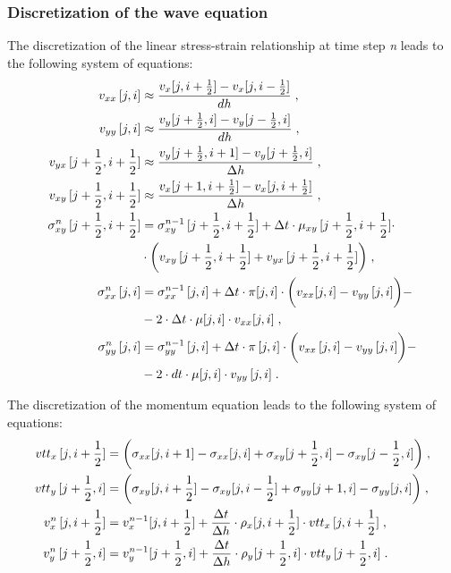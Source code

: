 \subsubsection{Discretization of the wave equation}
\label{discretization}
The discretization of the linear stress-strain relationship at time step \textit{n} leads to the following system of equations:
\begin{equation}
\allowdisplaybreaks
    \begin{split}
        v_{xx}\,[j,i] & \approx \frac{v_x [j,i+\frac{1}{2}]-v_x[j,i-\frac{1}{2}]}{dh}\;,\\
        v_{yy}\,[j,i] & \approx \frac{v_y [j+\frac{1}{2},i]-v_y[j-\frac{1}{2},i]}{dh}\;,\\
        v_{yx}\,[j+\frac{1}{2},i+\frac{1}{2}] & \approx \frac{v_y [j+\frac{1}{2},i+1]-v_y [j+\frac{1}{2},i]}{\Delta h}\;,\\
        v_{xy}\,[j+\frac{1}{2},i+\frac{1}{2}] & \approx \frac{v_x  [j+1,i+\frac{1}{2}]-v_x [j,i+\frac{1}{2}]}{\Delta h}\;,\\
        \sigma_{xy}^{n}\,[j+\frac{1}{2},i+\frac{1}{2}] &= \sigma_{xy}^{n-1}\,[j+\frac{1}{2},i+\frac{1}{2}] + \Delta t \cdot \mu_{xy} \,[j+\frac{1}{2},i+\frac{1}{2}] \cdot\\
        & \cdot \biggl(v_{xy}\,[j+\frac{1}{2},i+\frac{1}{2}] + v_{yx} \,[j+\frac{1}{2},i+\frac{1}{2}]\biggr)\;,\\
        \sigma_{xx}^{n}\,[j,i] &= \sigma_{xx}^{n-1}\,[j,i] + \Delta t \cdot \pi [j,i] \cdot \biggl(v_{xx} [j,i] - v_{yy}\,[j,i] \biggr) - \\
        & -2 \cdot \Delta t \cdot \mu [j,i] \cdot v_{xx} [j,i]\;,\\
        \sigma_{yy}^{n}\,[j,i] &= \sigma_{yy}^{n-1}\,[j,i] + \Delta t \cdot \pi\,[j,i] \cdot \biggl(v_{xx}\,[j,i] - v_{yy}\,[j,i] \biggr) -\\
        & -2 \cdot dt \cdot \mu [j,i] \cdot v_{yy}\,[j,i]\;.
        \label{eq:discr_stress}
    \end{split}
\end{equation}
 
The discretization of the momentum equation leads to the following system of equations:
\begin{equation}
\allowdisplaybreaks
    \begin{split}
        vtt_x\,[j,i+\frac{1}{2}] &= \biggl(\sigma_{xx} [j,i+1] - \sigma_{xx}[j,i] + \sigma_{xy}[j+\frac{1}{2},i] - \sigma_{xy}[j-\frac{1}{2},i] \biggr)\;,\\
        vtt_y\,[j+\frac{1}{2},i] &= \biggl(\sigma_{xy}[j,i+\frac{1}{2}] - \sigma_{xy}[j,i-\frac{1}{2}] + \sigma_{yy} [j+1,i] - \sigma_{yy} [j,i] \biggr)\;,\\
        v_x^{n}\,[j,i+\frac{1}{2}] &= v_x^{n-1} [j,i+\frac{1}{2}] + \frac{\Delta t}{\Delta h}\cdot\rho_x  [j,i+\frac{1}{2}] \cdot vtt_x\,[j,i+\frac{1}{2}]\;,\\
        v_y^{n}\,[j+\frac{1}{2},i] &= v_y^{n-1} [j+\frac{1}{2},i] + \frac{\Delta t}{\Delta h} \cdot \rho_y [j+\frac{1}{2},i] \cdot vtt_y\,[j+\frac{1}{2},i]\;.\\
        \label{eq:discr_momentum}
    \end{split}
\end{equation}

